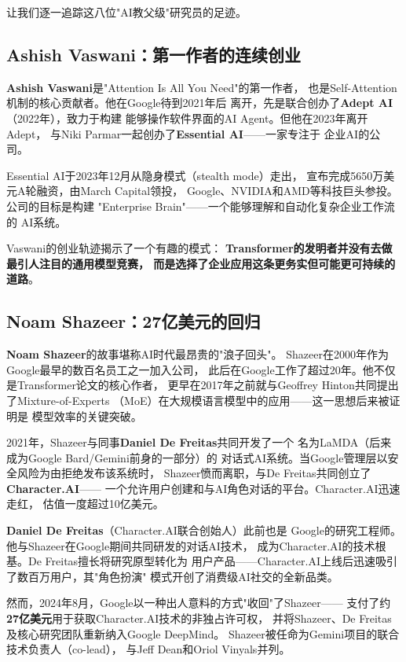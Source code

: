 让我们逐一追踪这八位"AI教父级"研究员的足迹。

\subsection{Ashish Vaswani：第一作者的连续创业}

\textbf{Ashish Vaswani}是"Attention Is All You Need"的第一作者，
也是Self-Attention机制的核心贡献者。他在Google待到2021年后
离开，先是联合创办了\textbf{Adept AI}（2022年），致力于构建
能够操作软件界面的AI Agent。但他在2023年离开Adept，
与Niki Parmar一起创办了\textbf{Essential AI}——一家专注于
企业AI的公司。

Essential AI于2023年12月从隐身模式（stealth mode）走出，
宣布完成5650万美元A轮融资，由March Capital领投，
Google、NVIDIA和AMD等科技巨头参投。公司的目标是构建
"Enterprise Brain"——一个能够理解和自动化复杂企业工作流的
AI系统。

Vaswani的创业轨迹揭示了一个有趣的模式：
\textbf{Transformer的发明者并没有去做最引人注目的通用模型竞赛，
而是选择了企业应用这条更务实但可能更可持续的道路}。

\subsection{Noam Shazeer：27亿美元的回归}

\textbf{Noam Shazeer}的故事堪称AI时代最昂贵的"浪子回头"。
Shazeer在2000年作为Google最早的数百名员工之一加入公司，
此后在Google工作了超过20年。他不仅是Transformer论文的核心作者，
更早在2017年之前就与Geoffrey Hinton共同提出了Mixture-of-Experts
（MoE）在大规模语言模型中的应用——这一思想后来被证明是
模型效率的关键突破。

2021年，Shazeer与同事\textbf{Daniel De Freitas}共同开发了一个
名为LaMDA（后来成为Google Bard/Gemini前身的一部分）的
对话式AI系统。当Google管理层以安全风险为由拒绝发布该系统时，
Shazeer愤而离职，与De Freitas共同创立了\textbf{Character.AI}——
一个允许用户创建和与AI角色对话的平台。Character.AI迅速走红，
估值一度超过10亿美元。

\textbf{Daniel De Freitas}（Character.AI联合创始人）此前也是
Google的研究工程师。他与Shazeer在Google期间共同研发的对话AI技术，
成为Character.AI的技术根基。De Freitas擅长将研究原型转化为
用户产品——Character.AI上线后迅速吸引了数百万用户，其"角色扮演"
模式开创了消费级AI社交的全新品类。

然而，2024年8月，Google以一种出人意料的方式"收回"了Shazeer——
支付了约\textbf{27亿美元}用于获取Character.AI技术的非独占许可权，
并将Shazeer、De Freitas及核心研究团队重新纳入Google DeepMind。
Shazeer被任命为Gemini项目的联合技术负责人（co-lead），
与Jeff Dean和Oriol Vinyals并列。

